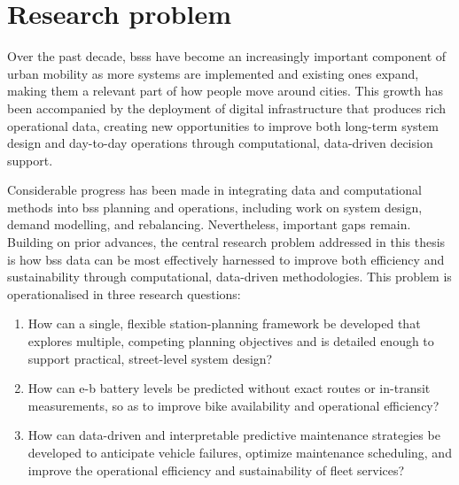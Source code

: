 \section{Research problem}
\label{sec:conclusions_research_problem}

Over the past decade, \acp{bss} have become an increasingly important component of urban mobility as more systems are implemented and existing ones expand, making them a relevant part of how people move around cities. This growth has been accompanied by the deployment of digital infrastructure that produces rich operational data, creating new opportunities to improve both long-term system design and day-to-day operations through computational, data-driven decision support.

Considerable progress has been made in integrating data and computational methods into \ac{bss} planning and operations, including work on system design, demand modelling, and rebalancing. Nevertheless, important gaps remain. Building on prior advances, the central research problem addressed in this thesis is how \ac{bss} data can be most effectively harnessed to improve both efficiency and sustainability through computational, data-driven methodologies. This problem is operationalised in three research questions:

\begin{enumerate}
    \item How can a single, flexible station-planning framework be developed that explores multiple, competing planning objectives and is detailed enough to support practical, street-level system design?
    \item How can \ac{e-b} battery levels be predicted without exact routes or in-transit measurements, so as to improve bike availability and operational efficiency?
    \item How can data-driven and interpretable predictive maintenance strategies be developed to anticipate vehicle failures, optimize maintenance scheduling, and improve the operational efficiency and sustainability of fleet services?
\end{enumerate}


